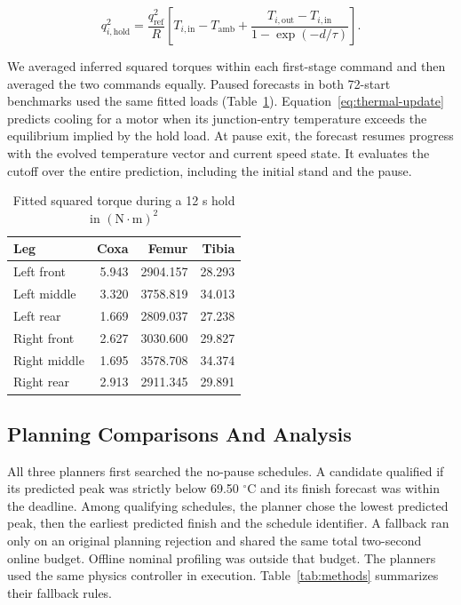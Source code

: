 \documentclass{ieeeaccess}
\begin{document}
\begin{equation}
q_{i,\mathrm{hold}}^2 =
\frac{q_{\mathrm{ref}}^2}{R}
\left[T_{i,\mathrm{in}}-T_{\mathrm{amb}}+
\frac{T_{i,\mathrm{out}}-T_{i,\mathrm{in}}}{1-\exp(-d/\tau)}\right].
\end{equation}

We averaged inferred squared torques within each first-stage command and then averaged the two commands equally. Paused forecasts in both 72-start benchmarks used the same fitted loads (Table~\ref{tab:hold-loads}). Equation~\eqref{eq:thermal-update} predicts cooling for a motor when its junction-entry temperature exceeds the equilibrium implied by the hold load. At pause exit, the forecast resumes progress with the evolved temperature vector and current speed state. It evaluates the cutoff over the entire prediction, including the initial stand and the pause.

\begin{table}[!t]
\caption{Fitted squared torque during a 12 s hold in $(\mathrm{N}{\cdot}\mathrm{m})^2$}
\label{tab:hold-loads}
\centering
\footnotesize
\renewcommand{\arraystretch}{1.12}
\begin{tabular}{@{}lrrr@{}}
\hline
Leg & Coxa & Femur & Tibia \\
\hline
Left front & 5.943 & 2904.157 & 28.293 \\
Left middle & 3.320 & 3758.819 & 34.013 \\
Left rear & 1.669 & 2809.037 & 27.238 \\
Right front & 2.627 & 3030.600 & 29.827 \\
Right middle & 1.695 & 3578.708 & 34.374 \\
Right rear & 2.913 & 2911.345 & 29.891 \\
\hline
\end{tabular}
\end{table}

\subsection{Planning Comparisons And Analysis}

All three planners first searched the no-pause schedules. A candidate qualified if its predicted peak was strictly below 69.50 \ensuremath{{}^{\circ}\mathrm{C}} and its finish forecast was within the deadline. Among qualifying schedules, the planner chose the lowest predicted peak, then the earliest predicted finish and the schedule identifier. A fallback ran only on an original planning rejection and shared the same total two-second online budget. Offline nominal profiling was outside that budget. The planners used the same physics controller in execution. Table~\ref{tab:methods} summarizes their fallback rules.
\end{document}
